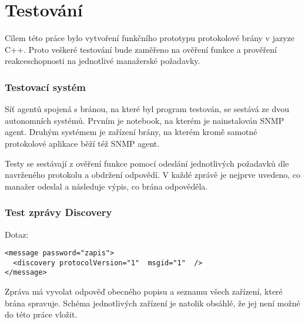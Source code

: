 \chapter{Testování}
\label{kap_testovani}
Cílem této práce bylo vytvoření funkčního prototypu protokolové brány v jazyze C++. Proto
veškeré testování bude zaměřeno na ověření funkce a prověření reakceschopnosti na jednotlivé
manažerské požadavky.

\subsection*{Testovací systém}
Síť agentů spojená s bránou, na které byl program testován, se sestává ze dvou autonomních systémů.
Prvním je notebook, na kterém je nainstalován SNMP agent. Druhým systémem je zařízení brány, na kterém
kromě samotné protokolové aplikace běží též SNMP agent.

Testy se sestávají z ověření funkce pomocí odeslání jednotlivých požadavků dle navrženého protokolu a obdržení odpovědí.
V každé zprávě je nejprve uvedeno, co manažer odeslal a následuje výpis, co brána odpověděla.

\subsection*{Test zprávy Discovery}
Dotaz:
\begin{verbatim}
<message password="zapis">
  <discovery protocolVersion="1"  msgid="1"  />
</message>
\end{verbatim}

Zpráva má vyvolat odpověď obecného popisu a seznamu všech zařízení, které brána spravuje. Schéma
jednotlivých zařízení je natolik obsáhlé, že jej není možné do této práce vložit.

